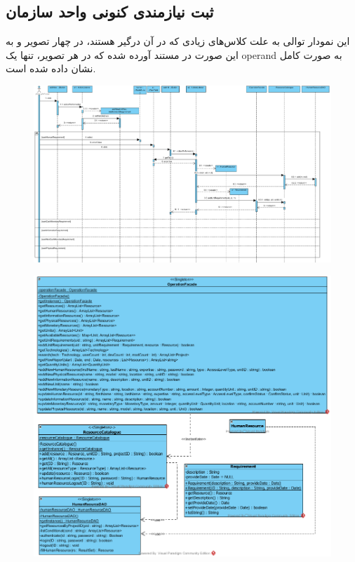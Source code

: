 \begin{landscape}
\section{ثبت نیازمندی کنونی واحد سازمان}
این نمودار توالی به علت کلاس‌های زیادی که در آن درگیر هستند، در چهار تصویر و به این صورت در مستند آورده شده که در هر تصویر، تنها یک operand به صورت کامل نشان داده شده است.
\begin{figure}[H]
	\centering
	\includegraphics[scale=0.5]{img/sequence-design/AddRequirementToUnit_HUMAN}
\end{figure}
\begin{figure}[H]
	\centering
	\includegraphics[scale=0.5]{img/sequence-design/AddRequirementToUnit_HUMANC}

\end{figure}
\end{landscape}
